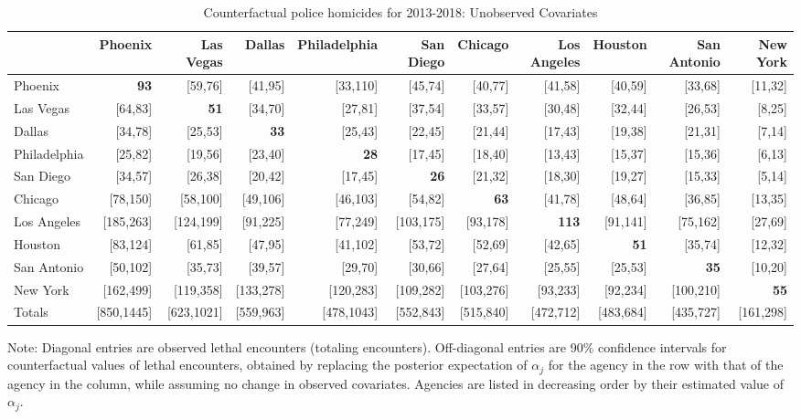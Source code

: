 \begin{table}[h!]\centering\scriptsize\tabcolsep=0.1cm\caption{Counterfactual police homicides for 2013-2018: Unobserved Covariates} \label{table:counterfactual_unobs}\begin{tabular}{lrrrrrrrrrr}\hline \hline&Phoenix&Las Vegas&Dallas&Philadelphia&San Diego&Chicago&Los Angeles&Houston&San Antonio&New York\\
\hline
Phoenix&\textbf{93}&[59,76]&[41,95]&[33,110]&[45,74]&[40,77]&[41,58]&[40,59]&[33,68]&[11,32]\\
Las Vegas&[64,83]&\textbf{51}&[34,70]&[27,81]&[37,54]&[33,57]&[30,48]&[32,44]&[26,53]&[8,25]\\
Dallas&[34,78]&[25,53]&\textbf{33}&[25,43]&[22,45]&[21,44]&[17,43]&[19,38]&[21,31]&[7,14]\\
Philadelphia&[25,82]&[19,56]&[23,40]&\textbf{28}&[17,45]&[18,40]&[13,43]&[15,37]&[15,36]&[6,13]\\
San Diego&[34,57]&[26,38]&[20,42]&[17,45]&\textbf{26}&[21,32]&[18,30]&[19,27]&[15,33]&[5,14]\\
Chicago&[78,150]&[58,100]&[49,106]&[46,103]&[54,82]&\textbf{63}&[41,78]&[48,64]&[36,85]&[13,35]\\
Los Angeles&[185,263]&[124,199]&[91,225]&[77,249]&[103,175]&[93,178]&\textbf{113}&[91,141]&[75,162]&[27,69]\\
Houston&[83,124]&[61,85]&[47,95]&[41,102]&[53,72]&[52,69]&[42,65]&\textbf{51}&[35,74]&[12,32]\\
San Antonio&[50,102]&[35,73]&[39,57]&[29,70]&[30,66]&[27,64]&[25,55]&[25,53]&\textbf{35}&[10,20]\\
New York&[162,499]&[119,358]&[133,278]&[120,283]&[109,282]&[103,276]&[93,233]&[92,234]&[100,210]&\textbf{55}\\
\hline
Totals&[850,1445]&[623,1021]&[559,963]&[478,1043]&[552,843]&[515,840]&[472,712]&[483,684]&[435,727]&[161,298]\\
\hline\end{tabular}\begin{center}\begin{minipage}{1.05\textwidth} %
 {\footnotesize {\schape Note}: Diagonal entries are observed lethal encounters (totaling \totalincidentsten{} encounters). Off-diagonal entries are 90\% confidence intervals for counterfactual values of lethal encounters, obtained by replacing the posterior expectation of $\alpha_j$ for the agency in the row with that of the agency in the column, while assuming no change in observed covariates. Agencies are listed in decreasing order by their estimated value of $\alpha_j$.} 
 \end{minipage} 
 \end{center} 
 \end{table} 
